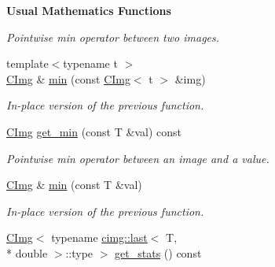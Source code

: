 \begin{Indent}{\bf Usual Mathematics Functions}
\begin{DoxyCompactItemize}
\begin{DoxyCompactList}\small\item\em Pointwise min operator between two images. \end{DoxyCompactList}\item 
\hypertarget{structcimg__library_1_1_c_img_adf73a40c6f513449e70dd27d69285280}{{\footnotesize template$<$typename t $>$ }\\\hyperlink{structcimg__library_1_1_c_img}{C\-Img} \& \hyperlink{structcimg__library_1_1_c_img_adf73a40c6f513449e70dd27d69285280}{min} (const \hyperlink{structcimg__library_1_1_c_img}{C\-Img}$<$ t $>$ \&img)}\label{structcimg__library_1_1_c_img_adf73a40c6f513449e70dd27d69285280}

\begin{DoxyCompactList}\small\item\em In-\/place version of the previous function. \end{DoxyCompactList}\item 
\hypertarget{structcimg__library_1_1_c_img_a7acd104b13e4a30b13aafe1fd01c562c}{\hyperlink{structcimg__library_1_1_c_img}{C\-Img} \hyperlink{structcimg__library_1_1_c_img_a7acd104b13e4a30b13aafe1fd01c562c}{get\-\_\-min} (const T \&val) const }\label{structcimg__library_1_1_c_img_a7acd104b13e4a30b13aafe1fd01c562c}

\begin{DoxyCompactList}\small\item\em Pointwise min operator between an image and a value. \end{DoxyCompactList}\item 
\hypertarget{structcimg__library_1_1_c_img_af0c2954233976adbbf4ff80862d2e455}{\hyperlink{structcimg__library_1_1_c_img}{C\-Img} \& \hyperlink{structcimg__library_1_1_c_img_af0c2954233976adbbf4ff80862d2e455}{min} (const T \&val)}\label{structcimg__library_1_1_c_img_af0c2954233976adbbf4ff80862d2e455}

\begin{DoxyCompactList}\small\item\em In-\/place version of the previous function. \end{DoxyCompactList}\item 
\hypertarget{structcimg__library_1_1_c_img_aa602135848e9603913f4cda976b0c42d}{\hyperlink{structcimg__library_1_1_c_img}{C\-Img}$<$ typename \hyperlink{structcimg__library_1_1cimg_1_1last}{cimg\-::last}$<$ T, \\*
double $>$\-::type $>$ \hyperlink{structcimg__library_1_1_c_img_aa602135848e9603913f4cda976b0c42d}{get\-\_\-stats} () const }\label{structcimg__library_1_1_c_img_aa602135848e9603913f4cda976b0c42d}


\end{DoxyCompactItemize}
\end{Indent}
